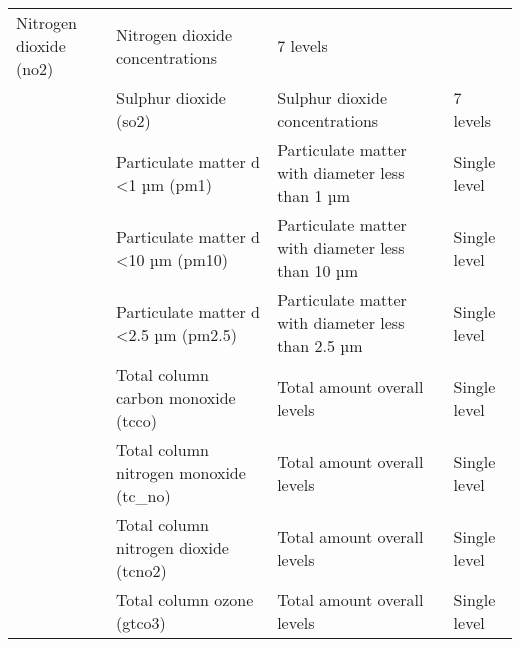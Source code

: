 \begin{table*}[t]
{\begin{tabular}{@{}llll@{}}
Nitrogen dioxide (no2)                        & Nitrogen dioxide concentrations                            & 7 levels     \\&
Sulphur dioxide (so2)                         & Sulphur dioxide concentrations                             & 7 levels     \\&
Particulate matter d \textless 1 µm (pm1)     & Particulate matter with diameter less than 1 µm            & Single level \\&
Particulate matter d \textless 10 µm (pm10)   & Particulate matter with diameter less than 10 µm           & Single level \\&
Particulate matter d \textless 2.5 µm (pm2.5) & Particulate matter with diameter less than 2.5 µm          & Single level \\&
Total column carbon monoxide (tcco)           & Total amount overall levels & Single level \\&
Total column nitrogen monoxide (tc\_no)       & Total amount overall levels & Single level \\&
Total column nitrogen dioxide (tcno2)         & Total amount overall levels & Single level \\&
Total column ozone (gtco3)                    & Total amount overall levels & Single level \\ \bottomrule
\end{tabular}
}
\end{table*}


